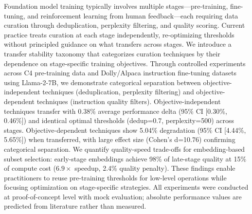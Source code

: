 
Foundation model training typically involves multiple stages---pre-training, fine-tuning, and reinforcement learning from human feedback---each requiring data curation through deduplication, perplexity filtering, and quality scoring. Current practice treats curation at each stage independently, re-optimizing thresholds without principled guidance on what transfers across stages. We introduce a transfer stability taxonomy that categorizes curation techniques by their dependence on stage-specific training objectives. Through controlled experiments across C4 pre-training data and Dolly/Alpaca instruction fine-tuning datasets using Llama-2-7B, we demonstrate categorical separation between objective-independent techniques (deduplication, perplexity filtering) and objective-dependent techniques (instruction quality filters). Objective-independent techniques transfer with 0.38\% average performance delta (95\% CI [0.30\%, 0.46\%]) and identical optimal thresholds (dedup=0.7, perplexity=500) across stages. Objective-dependent techniques show 5.04\% degradation (95\% CI [4.44\%, 5.65\%]) when transferred, with large effect size (Cohen's d=10.76) confirming categorical separation. We quantify quality-speed trade-offs for embedding-based subset selection: early-stage embeddings achieve 98\% of late-stage quality at 15\% of compute cost (6.$9\times$ speedup, 2.4\% quality penalty). These findings enable practitioners to reuse pre-training thresholds for low-level operations while focusing optimization on stage-specific strategies. All experiments were conducted at proof-of-concept level with mock evaluation; absolute performance values are predicted from literature rather than measured.
